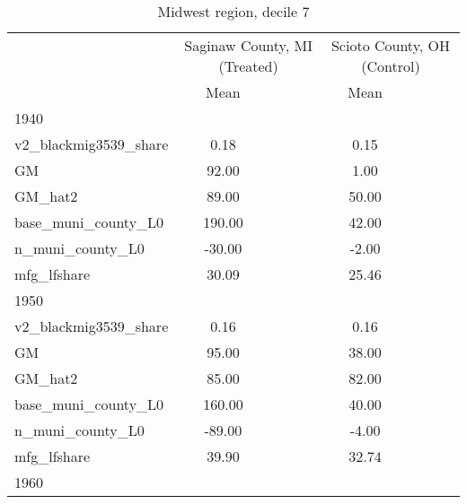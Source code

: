 \begin{table}[htbp]\centering
\def\sym#1{\ifmmode^{#1}\else\(^{#1}\)\fi}
\caption{Midwest region, decile 7 \label{tab1}}
\begin{tabular}{l*{2}{ccc}}
\toprule
                    &\multicolumn{3}{c}{Saginaw County, MI (Treated)}&\multicolumn{3}{c}{Scioto County, OH (Control)}\\
                    &        Mean&            &            &        Mean&            &            \\
\midrule
1940                &            &            &            &            &            &            \\
v2\_blackmig3539\_share&        0.18&            &            &        0.15&            &            \\
GM                  &       92.00&            &            &        1.00&            &            \\
GM\_hat2             &       89.00&            &            &       50.00&            &            \\
base\_muni\_county\_L0 &      190.00&            &            &       42.00&            &            \\
n\_muni\_county\_L0    &      -30.00&            &            &       -2.00&            &            \\
mfg\_lfshare         &       30.09&            &            &       25.46&            &            \\
\midrule
1950                &            &            &            &            &            &            \\
v2\_blackmig3539\_share&        0.16&            &            &        0.16&            &            \\
GM                  &       95.00&            &            &       38.00&            &            \\
GM\_hat2             &       85.00&            &            &       82.00&            &            \\
base\_muni\_county\_L0 &      160.00&            &            &       40.00&            &            \\
n\_muni\_county\_L0    &      -89.00&            &            &       -4.00&            &            \\
mfg\_lfshare         &       39.90&            &            &       32.74&            &            \\
\midrule
1960                &            &            &            &            &            &            \\

\end{tabular}
\end{table}
